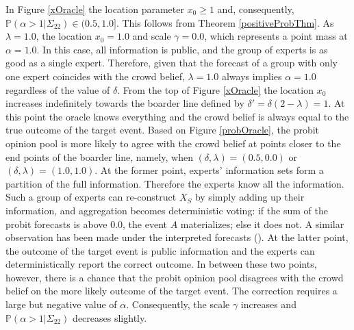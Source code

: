 \documentclass[11pt]{article}
\renewcommand{\P}{\mathbb{P}}
\theoremstyle{definition}
\theoremstyle{definition}
\begin{document}
In Figure \ref{xOracle} the location parameter $x_0 \geq 1$ and, consequently, $\P(\alpha > 1 | \Sigma_{22}) \in (0.5, 1.0]$. This follows from Theorem \ref{positiveProbThm}. As $\lambda = 1.0$, the location $x_0 = 1.0$ and scale $\gamma = 0.0$, which represents a point mass at $\alpha = 1.0$.  In this case, all information is public, and the group of experts is as good as a single expert. Therefore, given that the forecast of a group with only one expert coincides with the crowd belief, $\lambda = 1.0$ always implies $\alpha = 1.0$ regardless of the value of $\delta$. From the top of Figure \ref{xOracle} the location $x_0$ increases indefinitely towards the boarder line defined by $\delta' = \delta(2- \lambda) = 1$. At this point the oracle knows everything and the crowd belief is always equal to the true outcome of the target event. Based on Figure \ref{probOracle}, the probit opinion pool is more likely to agree with the crowd belief at points closer to the end points of the boarder line, namely, when $(\delta, \lambda) = (0.5, 0.0)$ or  $(\delta, \lambda) = (1.0, 1.0)$. At the former point, experts' information sets form a partition of the full information. Therefore the experts know all the information. Such a group of experts can re-construct $X_S$ by simply adding up their information, and aggregation becomes deterministic voting: if the sum of the probit forecasts is above $0.0$, the event $A$ materializes; else it does not. A similar observation has been made under the interpreted forecasts (\cite{hong2009interpreted}). At the latter point, the outcome of the target event is public information and the experts can deterministically report the correct outcome. In between these two points, however, there is a chance that the probit opinion pool disagrees with the crowd belief on the more likely outcome of the target event. The correction requires a large but negative value of $\alpha$. Consequently, the scale $\gamma$ increases and $\P(\alpha > 1 | \Sigma_{22})$ decreases slightly. 







\end{document}

